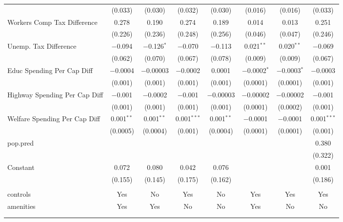 \begin{table}[!htbp]
\begin{tabular}{@{\extracolsep{5pt}}lccccccc}
  & (0.033) & (0.030) & (0.032) & (0.030) & (0.016) & (0.016) & (0.033) \\ 
  Workers Comp Tax Difference & 0.278 & 0.190 & 0.274 & 0.189 & 0.014 & 0.013 & 0.251 \\ 
  & (0.226) & (0.236) & (0.248) & (0.256) & (0.046) & (0.047) & (0.246) \\ 
  Unemp. Tax Difference & $-$0.094 & $-$0.126$^{*}$ & $-$0.070 & $-$0.113 & 0.021$^{**}$ & 0.020$^{**}$ & $-$0.069 \\ 
  & (0.062) & (0.070) & (0.067) & (0.078) & (0.009) & (0.009) & (0.067) \\ 
  Educ Spending Per Cap Diff & $-$0.0004 & $-$0.00003 & $-$0.0002 & 0.0001 & $-$0.0002$^{*}$ & $-$0.0003$^{*}$ & $-$0.0003 \\ 
  & (0.001) & (0.001) & (0.001) & (0.001) & (0.0001) & (0.0001) & (0.001) \\ 
  Highway Spending Per Cap Diff & $-$0.001 & $-$0.0002 & $-$0.001 & $-$0.00003 & $-$0.00002 & $-$0.00002 & $-$0.001 \\ 
  & (0.001) & (0.001) & (0.001) & (0.001) & (0.0001) & (0.0002) & (0.001) \\ 
  Welfare Spending Per Cap Diff & 0.001$^{**}$ & 0.001$^{**}$ & 0.001$^{***}$ & 0.001$^{**}$ & $-$0.0001 & $-$0.0001 & 0.001$^{***}$ \\ 
  & (0.0005) & (0.0004) & (0.001) & (0.0004) & (0.0001) & (0.0001) & (0.001) \\ 
  pop.pred &  &  &  &  &  &  & 0.380 \\ 
  &  &  &  &  &  &  & (0.322) \\ 
  Constant & 0.072 & 0.080 & 0.042 & 0.076 &  &  & 0.001 \\ 
  & (0.155) & (0.145) & (0.175) & (0.162) &  &  & (0.186) \\ 
 \hline \\[-1.8ex] 
controls & Yes & No & Yes & No & Yes & Yes & Yes \\ 
amenities & Yes & Yes & No & No & Yes & No & No \\ 
\hline \\[-1.8ex] 
\hline 
\hline \\[-1.8ex] 
\end{tabular} 
\end{table} 
